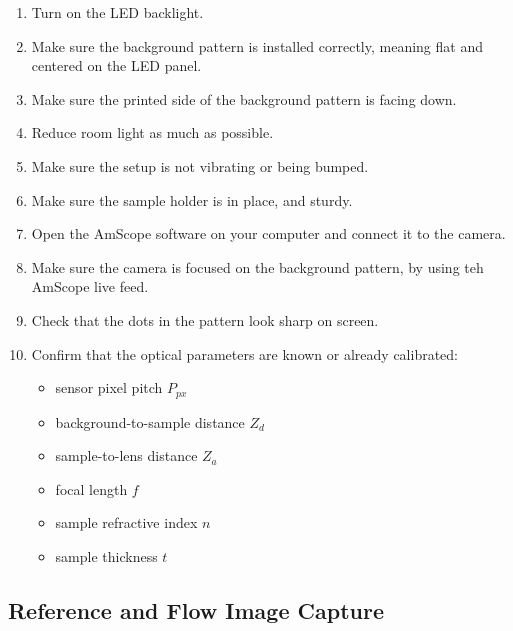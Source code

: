 \documentclass[11pt]{article}
\begin{document}
\begin{enumerate}
    \item Turn on the LED backlight.
    \item Make sure the background pattern is installed correctly, meaning flat and centered on the LED panel.
    \item Make sure the printed side of the background pattern is facing down.
    \item Reduce room light as much as possible.
    \item Make sure the setup is not vibrating or being bumped.
    \item Make sure the sample holder is in place, and sturdy.
    \item Open the AmScope software on your computer and connect it to the camera.
    \item Make sure the camera is focused on the background pattern, by using teh AmScope live feed.
    \item Check that the dots in the pattern look sharp on screen.
    \item Confirm that the optical parameters are known or already calibrated:
    \begin{itemize}
        \item sensor pixel pitch $P_{px}$
        \item background-to-sample distance $Z_d$
        \item sample-to-lens distance $Z_a$
        \item focal length $f$
        \item sample refractive index $n$
        \item sample thickness $t$
    \end{itemize}
\end{enumerate}

\subsection{Reference and Flow Image Capture}
\end{document}
